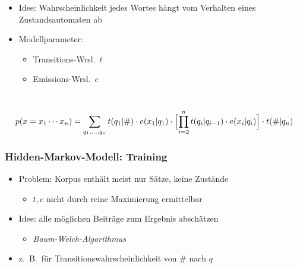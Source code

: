 \documentclass{beamer}
\begin{document}
\begin{frame}
\begin{columns}
  \begin{itemize}
   \item Idee: Wahrscheinlichkeit jedes Wortes hängt vom Verhalten eines Zustandsautomaten ab
   \pause\pause
   \item Modellparameter:
    \begin{itemize}
     \item Transitions-Wrsl.~$t$
     \item Emissions-Wrsl.~$e$
    \end{itemize}
  \end{itemize}
 \end{columns}
 \scriptsize\vspace{1em}\[
  p(x=x_1\cdots x_n) = \sum_{q_1,\ldots,q_n} t(q_1|\#) \cdot e(x_1|q_1) \cdot \Bigl[\prod_{i=2}^n t(q_i|q_{i-1}) \cdot e(x_i|q_i)\Bigr] \cdot t(\#|q_n)
 \]
\end{frame}

\begin{frame}
 \frametitle{Hidden-Markov-Modell: Training}
 \begin{itemize}
  \item Problem: Korpus enthält meist nur Sätze, keine Zustände
   \begin{itemize}
    \item $t,e$ nicht durch reine Maximierung ermittelbar
   \end{itemize}
  \pause\item Idee: alle möglichen Beiträge zum Ergebnis abschätzen
   \begin{itemize}
    \item \emph{Baum-Welch-Algorithmus}
   \end{itemize}
  \pause\item z.~B.~für Transitionswahrscheinlichkeit von $\#$ nach $q$
   \begin{center}\end{center}
 \end{itemize}
\end{frame}
\end{document}
